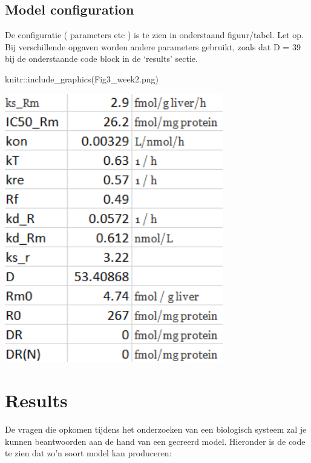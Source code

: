 \documentclass[
]{article}
\newenvironment{Shaded}{\begin{snugshade}}{\end{snugshade}}
\newcommand{\FunctionTok}[1]{\textcolor[rgb]{0.00,0.00,0.00}{#1}}
\newcommand{\NormalTok}[1]{#1}
\newcommand{\SpecialCharTok}[1]{\textcolor[rgb]{0.00,0.00,0.00}{#1}}
\newcommand{\StringTok}[1]{\textcolor[rgb]{0.31,0.60,0.02}{#1}}
\begin{document}
\hypertarget{model-configuration}{%
\subsection{Model configuration}\label{model-configuration}}

De configuratie ( parameters etc ) is te zien in onderstaand
figuur/tabel. Let op. Bij verschillende opgaven worden andere parameters
gebruikt, zoals dat D = 39 bij de onderstaande code block in de
`results' sectie.

\begin{Shaded}
\begin{Highlighting}[]
\NormalTok{knitr}\SpecialCharTok{::}\FunctionTok{include\_graphics}\NormalTok{(}\StringTok{\textquotesingle{}Fig3\_week2.png\textquotesingle{}}\NormalTok{)}
\end{Highlighting}
\end{Shaded}

\includegraphics[width=3.75in]{Fig3_week2}

\hypertarget{results}{%
\section{Results}\label{results}}

De vragen die opkomen tijdens het onderzoeken van een biologisch systeem
zal je kunnen beantwoorden aan de hand van een gecreerd model. Hieronder
is de code te zien dat zo'n soort model kan produceren:
\end{document}
